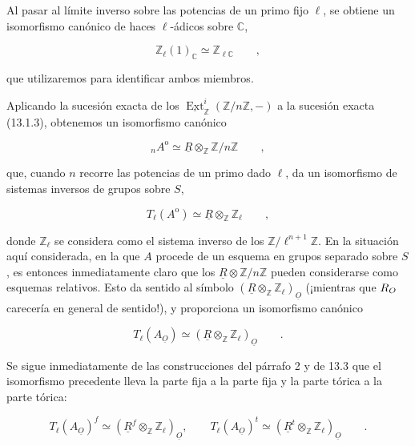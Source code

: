 \noindent
Al pasar al límite inverso sobre las potencias de un primo fijo
$\ell$, se obtiene un isomorfismo canónico de haces $\ell$-ádicos sobre
$\mathbb C$,

\begin{equation*}
 \mathbb Z_\ell(1)_{\mathbb C}\simeq\mathbb Z_{\ell\mathbb C}
 \qquad ,
\end{equation*}

\noindent
que utilizaremos para identificar ambos miembros.

Aplicando la sucesión exacta de los
$\underline{\operatorname{Ext}}^i_{\mathbb Z}
(\mathbb Z/n\mathbb Z,-)$ a la sucesión exacta (13.1.3), obtenemos un
isomorfismo canónico

\begin{equation}\tag{13.5.5}
 {}_nA^{\mathrm o}\simeq
 \underline R\otimes_{\mathbb Z}\mathbb Z/n\mathbb Z
 \qquad ,
\end{equation}

\noindent
que, cuando $n$ recorre las potencias de un primo dado $\ell$, da un
isomorfismo de sistemas inversos de grupos sobre $S$,

\begin{equation}\tag{13.5.6}
 T_\ell(A^{\mathrm o})\simeq
 \underline R\otimes_{\mathbb Z}\mathbb Z_\ell
 \qquad ,
\end{equation}

\noindent
donde $\mathbb Z_\ell$ se considera como el sistema inverso de los
$\mathbb Z/\ell^{n+1}\mathbb Z$. En la situación aquí considerada, en
la que $A$ procede de un esquema en grupos separado sobre $S$, es
entonces inmediatamente claro que los
$\underline R\otimes\mathbb Z/n\mathbb Z$ pueden considerarse como
esquemas relativos. Esto da sentido al símbolo
$(\underline R\otimes_{\mathbb Z}\mathbb Z_\ell)_{\underline O}$
(¡mientras que $\sisi{R}{\underline R}_{\underline O}$ carecería en general de sentido!), y
proporciona un isomorfismo canónico

\begin{equation}\tag{13.5.7}
 T_\ell(A_{\underline O})\simeq
 (\underline R\otimes_{\mathbb Z}\mathbb Z_\ell)_{\underline O}
 \qquad .
\end{equation}

\noindent
Se sigue inmediatamente de las construcciones del párrafo 2 y de 13.3
que el isomorfismo precedente lleva la parte fija a la parte fija y la
parte tórica a la parte tórica:

\begin{equation}\tag{13.5.8}
 T_\ell(A_{\underline O})^f\simeq
 (\underline R^f\otimes_{\mathbb Z}\mathbb Z_\ell)_{\underline O},
 \qquad
 T_\ell(A_{\underline O})^t\simeq
 (\underline R^t\otimes_{\mathbb Z}\mathbb Z_\ell)_{\underline O}
 \qquad .
\end{equation}

